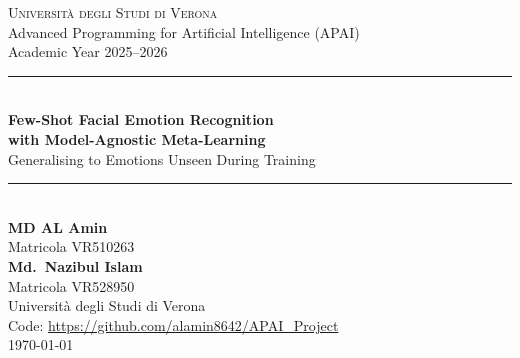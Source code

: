 \documentclass[11pt,a4paper]{article}
\begin{document}
\begin{titlepage}
\centering
\vspace*{2.5cm}

{\Large\scshape Universit\`a degli Studi di Verona}\\[0.3cm]
{\large Advanced Programming for Artificial Intelligence (APAI)}\\[0.2cm]
{\large Academic Year 2025--2026}\\[2.5cm]

\rule{\textwidth}{0.8pt}\\[0.6cm]
{\LARGE\bfseries Few-Shot Facial Emotion Recognition\\[0.25cm]
with Model-Agnostic Meta-Learning}\\[0.45cm]
{\large Generalising to Emotions Unseen During Training}\\[0.5cm]
\rule{\textwidth}{0.8pt}\\[2.0cm]

{\large\bfseries MD AL Amin}\\[0.15cm]
{\normalsize Matricola VR510263}\\[0.8cm]
{\large\bfseries Md.\ Nazibul Islam}\\[0.15cm]
{\normalsize Matricola VR528950}\\[0.8cm]
{\normalsize Universit\`a degli Studi di Verona}\\[2.2cm]

{\normalsize Code: \url{https://github.com/alamin8642/APAI_Project}}\\[1.2cm]

{\normalsize \today}

\vfill
\end{titlepage}
\end{document}
